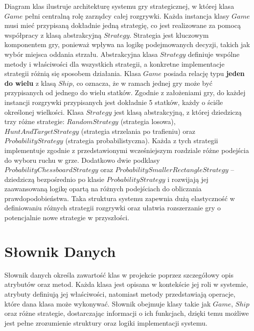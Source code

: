 \documentclass[magisterska]{pracadypl}
\begin{document}
Diagram klas ilustruje architekturę systemu gry strategicznej, w której klasa $Game$ pełni centralną rolę zarządcy całej rozgrywki. Każda instancja klasy $Game$ musi mieć przypisaną dokładnie jedną strategię, co jest realizowane za pomocą współpracy z klasą abstrakcyjną $Strategy$. Strategia jest kluczowym komponentem gry, ponieważ wpływa na logikę podejmowanych decyzji, takich jak wybór miejsca oddania strzału. Abstrakcyjna klasa $Strategy$ definiuje wspólne metody i właściwości dla wszystkich strategii, a konkretne implementacje strategii różnią się sposobem działania.
\newline
Klasa $Game$ posiada relację typu \textbf{jeden do wielu} z klasą $Ship$, co oznacza, że w ramach jednej gry może być przypisanych od jednego do wielu statków. Zgodnie z założeniami gry, do każdej instancji rozgrywki przypisanych jest dokładnie 5 statków, każdy o ściśle określonej wielkości.
\newline
Klasa $Strategy$ jest klasą abstrakcyjną, z której dziedziczą trzy różne strategie: $RandomStrategy$ (strategia losowa), $HuntAndTargetStrategy$ (strategia strzelania po trafieniu) oraz $ProbabilityStrategy$ (strategia probabilistyczna). Każda z tych strategii implementuje zgodnie z przedstawionymi wcześniejszym rozdziale różne podejścia do wyboru ruchu w grze.
\newline
Dodatkowo dwie podklasy $ProbabilityChessboardStrategy$ oraz 
\newline
$ProbabilitySmallerRectangleStrategy$ – dziedziczą bezpośrednio po klasie $ProbabilityStrategy$ i rozwijają jej zaawansowaną logikę opartą na różnych podejściach do obliczania prawdopodobieństwa. 
\newline
Taka struktura systemu zapewnia dużą elastyczność w definiowaniu różnych strategii rozgrywki oraz ułatwia rozszerzanie gry o potencjalnie nowe strategie w przyszłości.

\section{Słownik Danych}
Słownik danych określa zawartość klas w projekcie poprzez szczegółowy opis atrybutów oraz metod. Każda klasa jest opisana w kontekście jej roli w systemie, atrybuty definiują jej właściwości, natomiast metody przedstawiają operacje, które dana klasa może wykonywać. Słownik obejmuje klasy takie jak $Game$, $Ship$ oraz różne strategie, dostarczając informacji o ich funkcjach, dzięki temu możliwe jest pełne zrozumienie struktury oraz logiki implementacji systemu.
\end{document}
